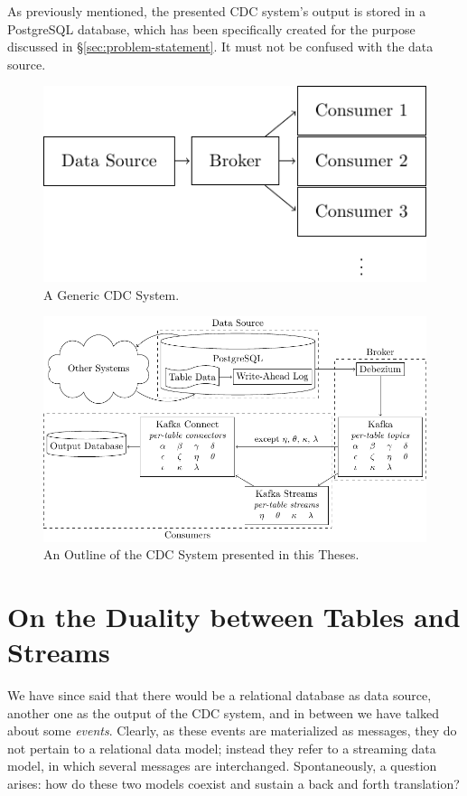 As previously mentioned, the presented CDC system's output is stored in a PostgreSQL database, which has been specifically created for the purpose discussed in \S \ref{sec:problem-statement}.
It must not be confused with the data source.

\begin{figure}
\centering
\includegraphics[]{figures/introduction/cdc-generic}
\caption{A Generic CDC System.}
\label{fig:cdc-generic}
\end{figure}

\begin{figure}
\centering
\includegraphics[width=\linewidth]{figures/introduction/cdc-complete}
\caption{An Outline of the CDC System presented in this Theses.}
\label{fig:cdc-complete}
\end{figure}



\section{On the Duality between Tables and Streams}
\label{sec:tables-streams}

We have since said that there would be a relational database as data source, another one as the output of the CDC system, and in between we have talked about some \emph{events}.
Clearly, as these events are materialized as messages, they do not pertain to a relational data model; instead they refer to a streaming data model, in which several messages are interchanged.
Spontaneously, a question arises: how do these two models coexist and sustain a back and forth translation?

